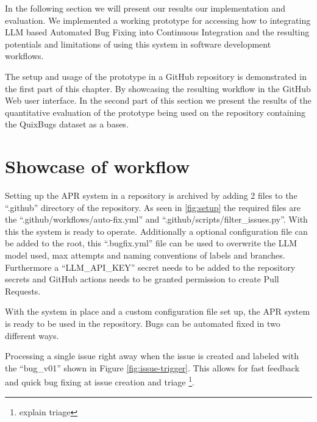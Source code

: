 In the following section we will present our results our implementation and evaluation. We implemented a working prototype for accessing how to integrating LLM based Automated Bug Fixing into Continuous Integration and the resulting potentials and limitations of using this system in software development workflows.

The setup and usage of the prototype in a GitHub repository is demonstrated in the first part of this chapter. By showcasing the resulting workflow in the GitHub Web user interface. In the second part of this section we  present the results of the quantitative evaluation of the prototype being used on the repository containing the QuixBugs dataset as a bases.

\section{Showcase of workflow} \label{section:showcase}

Setting up the APR system in a repository is archived by adding 2 files to the ``.github'' directory of the repository. As seen in \ref{fig:setup} the required files are the ``.github/workflows/auto-fix.yml'' and ``.github/scripts/filter\_issues.py''. With this the system is ready to operate. Additionally a optional configuration file can be added to the root, this ``.bugfix.yml'' file can be used to overwrite the LLM model used, max attempts and naming conventions of labels and branches. Furthermore a ``LLM\_API\_KEY'' secret needs to be added to the repository secrets and GitHub actions needs to be granted permission to create Pull Requests.


With the system in place and a custom configuration file set up, the APR system is ready to be used in the repository. Bugs can be automated fixed in two different ways.

Processing a single issue right away when the issue is created and labeled with the ``bug\_v01'' shown in Figure \ref{fig:issue-trigger}. This allows for fast feedback and quick bug fixing at issue creation and triage \footnote{explain triage}.


